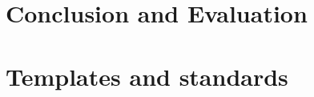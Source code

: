 \documentclass[11pt, a4paper]{article}
\begin{document}
\newpage

\newpage

\newpage

\newpage


\newpage
\section{Conclusion and Evaluation}




\newpage
\section{Templates and standards}


\end{document}
